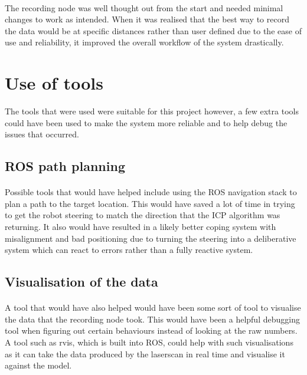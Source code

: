 \paragraph{}
The recording node was well thought out from the start and needed minimal changes to work as intended. When it was realised that the best way to record the data would be at specific distances rather than user defined due to the ease of use and reliability, it improved the overall workflow of the system drastically.

\section{Use of tools}
The tools that were used were suitable for this project however, a few extra tools could have been used to make the system more reliable and to help debug the issues that occurred.

\subsection{ROS path planning}
\paragraph{}
Possible tools that would have helped include using the ROS navigation stack to plan a path to the target location. This would have saved a lot of time in trying to get the robot steering to match the direction that the ICP algorithm was returning. It also would have resulted in a likely better coping system with misalignment and bad positioning due to turning the steering into a deliberative system which can react to errors rather than a fully reactive system.

\subsection{Visualisation of the data}
\paragraph{}
A tool that would have also helped would have been some sort of tool to visualise the data that the recording node took. This would have been a helpful debugging tool when figuring out certain behaviours instead of looking at the raw numbers. A tool such as rvis\cite{RVIS}, which is built into ROS, could help with such visualisations as it can take the data produced by the laserscan in real time and visualise it against the model.

